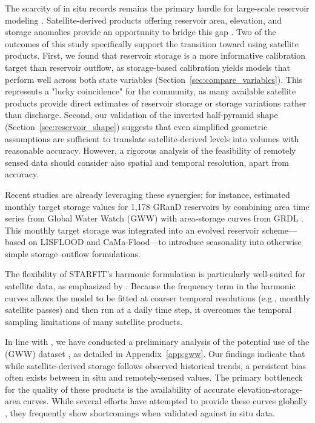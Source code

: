 \documentclass[hess, manuscript]{copernicus}
\begin{document}
The scarcity of in situ records remains the primary hurdle for large-scale reservoir modeling \citep{Shen2025}. Satellite-derived products offering reservoir area, elevation, and storage anomalies provide an opportunity to bridge this gap \citep{Zhao2018, Schwatke2020, Donchyts2022, Khandelwal2022, Hao2024, Hou2024}. Two of the outcomes of this study specifically support the transition toward using satellite products. First, we found that reservoir storage is a more informative calibration target than reservoir outflow, as storage-based calibration yields models that perform well across both state variables (Section~\ref{sec:compare_variables}). This represents a "lucky coincidence" for the community, as many available satellite products provide direct estimates of reservoir storage or storage variations rather than discharge. Second, our validation of the inverted half-pyramid shape (Section~\ref{sec:reservoir_shape}) suggests that even simplified geometric assumptions are sufficient to translate satellite-derived levels into volumes with reasonable accuracy. However, a rigorous analysis of the feasibility of remotely sensed data should consider also spatial and temporal resolution, apart from accuracy.

Recent studies are already leveraging these synergies; for instance, \citet{Shen2025} estimated monthly target storage values for 1,178 GRanD reservoirs by combining area time series from Global Water Watch (GWW) \citep{Donchyts2022} with area-storage curves from GRDL \citep{Hao2024}. This monthly target storage was integrated into an evolved reservoir scheme—based on LISFLOOD and CaMa-Flood—to introduce seasonality into otherwise simple storage--outflow formulations. 

The flexibility of STARFIT’s harmonic formulation is particularly well-suited for satellite data, as emphasized by \citet{Steyaert2025}. Because the frequency term in the harmonic curves allows the model to be fitted at coarser temporal resolutions (e.g., monthly satellite passes) and then run at a daily time step, it overcomes the temporal sampling limitations of many satellite products.

In line with \citet{Shen2025}, we have conducted a preliminary analysis of the potential use of the (GWW) dataset \citep{Donchyts2022}, as detailed in Appendix~\ref{app:gww}. Our findings indicate that while satellite-derived storage follows observed historical trends, a persistent bias often exists between in situ and remotely-sensed values. The primary bottleneck for the quality of these products is the availability of accurate elevation-storage-area curves. While several efforts have attempted to provide these curves globally \citep{Yigzaw2018, Busker2019, Khazaei2022}, they frequently show shortcomings when validated against in situ data.
\end{document}
